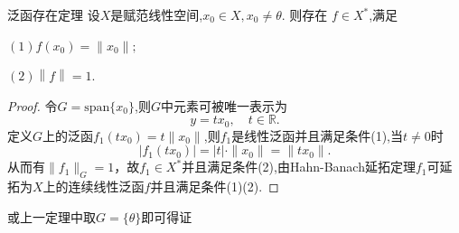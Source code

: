\documentclass[lang=cn,18pt]{elegantbook}
\begin{document}
\begin{theorem}{泛函存在定理}
    设$X$是赋范线性空间,$x_0\in X,x_0\neq\theta.$ 则存在 $f\in X^*$,满足

$(1)f(x_0)=\|x_0\|;$

$(2)\left\|f\right\|=1.$
\end{theorem}
\begin{proof}
    令$G=\text{span}\{x_0\}$,则$G$中元素可被唯一表示为
    $$y=tx_0 ,\quad t \in \mathbb{R}.$$
    定义$G$上的泛函$f_1(tx_0)=t\|x_0\|$,则$f_1$是线性泛函并且满足条件(1),当$t\not= 0$时
    $$|f_1(tx_0)|=|t|\cdot \|x_0\|=\|tx_0\|.$$
    从而有$\|f_1\|_{G}=1$，故$f_1 \in X^*$并且满足条件(2),由Hahn-Banach延拓定理$f_1$可延拓为$X$上的连续线性泛函$f$并且满足条件(1)(2).
\end{proof}
\begin{note}
    或上一定理中取$G=\{\theta\}$即可得证
\end{note}
\end{document}
